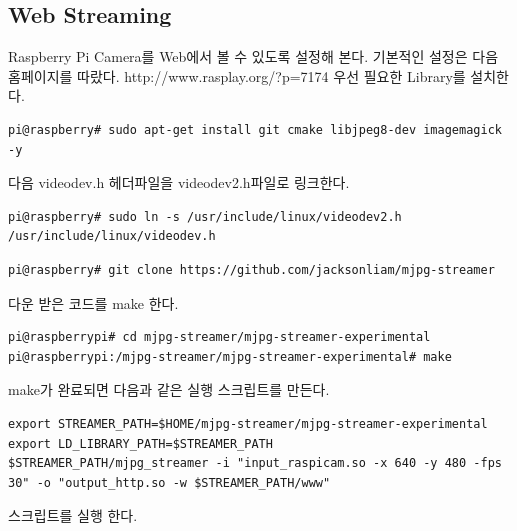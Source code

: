 \documentclass[11pt
  , a4paper
  , article
  , oneside
]{memoir}
\begin{document}
\subsection{Web Streaming}
Raspberry Pi Camera를 Web에서 볼 수 있도록 설정해 본다.
기본적인 설정은 다음 홈페이지를 따랐다.
http://www.rasplay.org/?p=7174
우선 필요한 Library를 설치한다.
\begin{lstlisting}[style=termstyle]
pi@raspberry# sudo apt-get install git cmake libjpeg8-dev imagemagick -y
\end{lstlisting}
다음 videodev.h 헤더파일을 videodev2.h파일로 링크한다.
\begin{lstlisting}[style=termstyle]
pi@raspberry# sudo ln -s /usr/include/linux/videodev2.h /usr/include/linux/videodev.h
\end{lstlisting}
\begin{lstlisting}[style=termstyle]
pi@raspberry# git clone https://github.com/jacksonliam/mjpg-streamer
\end{lstlisting}
다운 받은 코드를 make 한다.
\begin{lstlisting}[style=termstyle]
pi@raspberrypi# cd mjpg-streamer/mjpg-streamer-experimental
pi@raspberrypi:/mjpg-streamer/mjpg-streamer-experimental# make
\end{lstlisting}
make가 완료되면 다음과 같은 실행 스크립트를 만든다.
\begin{lstlisting}[style=termstylenumber, caption={Editing \texttt{/etc/fai/NFSROOT}}, label={list:nfsroot-file}]
export STREAMER_PATH=$HOME/mjpg-streamer/mjpg-streamer-experimental
export LD_LIBRARY_PATH=$STREAMER_PATH
$STREAMER_PATH/mjpg_streamer -i "input_raspicam.so -x 640 -y 480 -fps 30" -o "output_http.so -w $STREAMER_PATH/www"
\end{lstlisting}
스크립트를 실행 한다.
\end{document}
